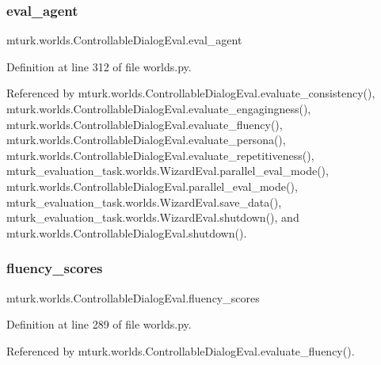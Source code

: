\subsubsection{\texorpdfstring{eval\+\_\+agent}{eval\_agent}}
{\footnotesize\ttfamily mturk.\+worlds.\+Controllable\+Dialog\+Eval.\+eval\+\_\+agent}



Definition at line 312 of file worlds.\+py.



Referenced by mturk.\+worlds.\+Controllable\+Dialog\+Eval.\+evaluate\+\_\+consistency(), mturk.\+worlds.\+Controllable\+Dialog\+Eval.\+evaluate\+\_\+engagingness(), mturk.\+worlds.\+Controllable\+Dialog\+Eval.\+evaluate\+\_\+fluency(), mturk.\+worlds.\+Controllable\+Dialog\+Eval.\+evaluate\+\_\+persona(), mturk.\+worlds.\+Controllable\+Dialog\+Eval.\+evaluate\+\_\+repetitiveness(), mturk\+\_\+evaluation\+\_\+task.\+worlds.\+Wizard\+Eval.\+parallel\+\_\+eval\+\_\+mode(), mturk.\+worlds.\+Controllable\+Dialog\+Eval.\+parallel\+\_\+eval\+\_\+mode(), mturk\+\_\+evaluation\+\_\+task.\+worlds.\+Wizard\+Eval.\+save\+\_\+data(), mturk\+\_\+evaluation\+\_\+task.\+worlds.\+Wizard\+Eval.\+shutdown(), and mturk.\+worlds.\+Controllable\+Dialog\+Eval.\+shutdown().

\mbox{\label{classmturk_1_1worlds_1_1ControllableDialogEval_ac7a2b215fda842a612f96fcd1cc0296f}} 
\subsubsection{\texorpdfstring{fluency\+\_\+scores}{fluency\_scores}}
{\footnotesize\ttfamily mturk.\+worlds.\+Controllable\+Dialog\+Eval.\+fluency\+\_\+scores}



Definition at line 289 of file worlds.\+py.



Referenced by mturk.\+worlds.\+Controllable\+Dialog\+Eval.\+evaluate\+\_\+fluency().

\mbox{\label{classmturk_1_1worlds_1_1ControllableDialogEval_a941e7fc113c8974d3c504fc55f1d51a6}} 
